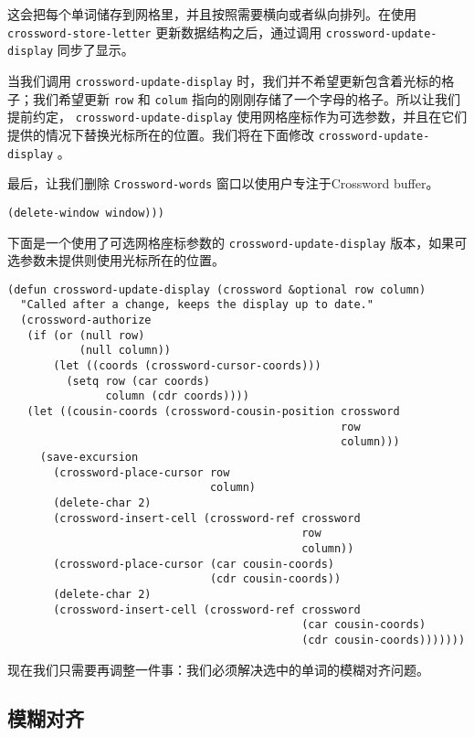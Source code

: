 这会把每个单词储存到网格里，并且按照需要横向或者纵向排列。在使用 \texttt{crossword-store-letter} 更新数据结构之后，通过调用 \texttt{crossword-update-display} 同步了显示。

当我们调用 \texttt{crossword-update-display} 时，我们并不希望更新包含着光标的格子；我们希望更新 \texttt{row} 和 \texttt{colum} 指向的刚刚存储了一个字母的格子。所以让我们提前约定， \texttt{crossword-update-display} 使用网格座标作为可选参数，并且在它们提供的情况下替换光标所在的位置。我们将在下面修改 \texttt{crossword-update-display} 。

最后，让我们删除 \texttt{Crossword-words} 窗口以使用户专注于Crossword buffer。

\begin{verbatim}
(delete-window window)))
\end{verbatim}

下面是一个使用了可选网格座标参数的 \texttt{crossword-update-display} 版本，如果可选参数未提供则使用光标所在的位置。

\begin{verbatim}
(defun crossword-update-display (crossword &optional row column)
  "Called after a change, keeps the display up to date."
  (crossword-authorize
   (if (or (null row)
           (null column))
       (let ((coords (crossword-cursor-coords)))
         (setq row (car coords)
               column (cdr coords))))
   (let ((cousin-coords (crossword-cousin-position crossword
                                                   row
                                                   column)))
     (save-excursion
       (crossword-place-cursor row
                               column)
       (delete-char 2)
       (crossword-insert-cell (crossword-ref crossword
                                             row
                                             column))
       (crossword-place-cursor (car cousin-coords)
                               (cdr cousin-coords))
       (delete-char 2)
       (crossword-insert-cell (crossword-ref crossword
                                             (car cousin-coords)
                                             (cdr cousin-coords)))))))
\end{verbatim}

现在我们只需要再调整一件事：我们必须解决选中的单词的模糊对齐问题。

\subsection{模糊对齐}
\label{section:10-Ambiguous-Alignment}

